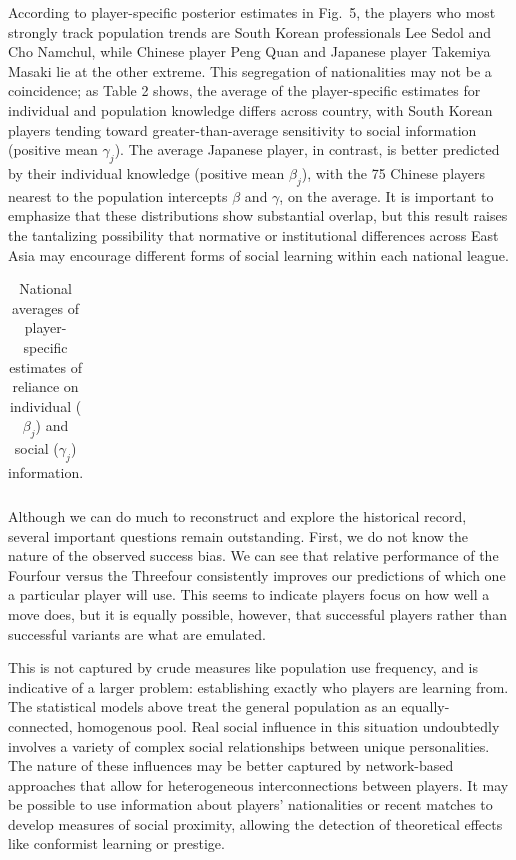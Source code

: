 \documentclass{article}
\begin{document}
According to player-specific posterior estimates in Fig.~5, the players who most strongly track population trends are South Korean professionals Lee Sedol and Cho Namchul, while Chinese player Peng Quan and Japanese player Takemiya Masaki lie at the other extreme.  This segregation of nationalities may not be a coincidence; as Table 2 shows, the average of the player-specific estimates for individual and population knowledge differs across country, with South Korean players tending toward greater-than-average sensitivity to social information (positive mean $\gamma_j$).  The average Japanese player, in contrast, is better predicted by their individual knowledge (positive mean $\beta_j$), with the 75 Chinese players nearest to the population intercepts $\beta$ and $\gamma$, on the average.  It is important to emphasize that these distributions show substantial overlap, but this result raises the tantalizing possibility that normative or institutional differences across East Asia may encourage different forms of social learning within each national league.   

\begin{table}[tbp]
  \centering
    \begin{tabular}{lrrrrr}
	
    \end{tabular}%
	\caption{National averages of player-specific estimates of reliance on individual ($\beta_j$) and social ($\gamma_j$) information.}
\end{table}%

Although we can do much to reconstruct and explore the historical record, several important questions remain outstanding.  First, we do not know the nature of the observed success bias.  We can see that relative performance of the Fourfour versus the Threefour consistently improves our predictions of which one a particular player will use.  This seems to indicate players focus on how well a move does, but it is equally possible, however, that successful players rather than successful variants are what are emulated.  

This is not captured by crude measures like population use frequency, and is indicative of a larger problem: establishing exactly who players are learning from.  The statistical models above treat the general population as an equally-connected, homogenous pool.  Real social influence in this situation undoubtedly involves a variety of complex social relationships between unique personalities.  The nature of these influences may be better captured by network-based approaches that allow for heterogeneous interconnections between players.  It may be possible to use information about players' nationalities or recent matches to develop measures of social proximity, allowing the detection of theoretical effects like conformist learning or prestige.
\end{document}
